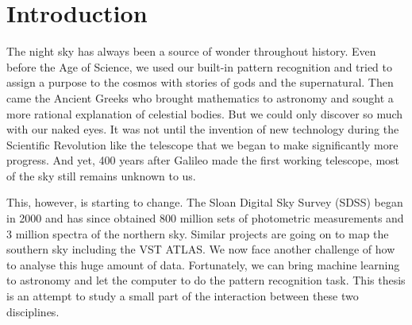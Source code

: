 
\chapter{Introduction}
\label{cha:intro}
The night sky has always been a source of wonder throughout history. Even before the Age of
Science, we used our built-in pattern recognition and tried to assign a purpose to
the cosmos with stories of gods and the supernatural. Then came the Ancient Greeks who brought
mathematics to astronomy and sought a more rational explanation of celestial bodies.
But we could only discover so much with our naked eyes. It was not until the invention
of new technology during the Scientific Revolution like the telescope that we began to
make significantly more progress. And yet, 400 years after Galileo made the first working
telescope, most of the sky still remains unknown to us.

This, however, is starting to change. The Sloan Digital Sky Survey (SDSS) began
in 2000 and has since obtained 800 million sets of photometric measurements
and 3 million spectra of the northern sky. Similar projects are going on
to map the southern sky including the VST ATLAS. We now face another challenge of how
to analyse this huge amount of data. Fortunately, we can bring machine learning
to astronomy and let the computer to do the pattern recognition task.
This thesis is an attempt to study a small part of the interaction between these
two disciplines.


